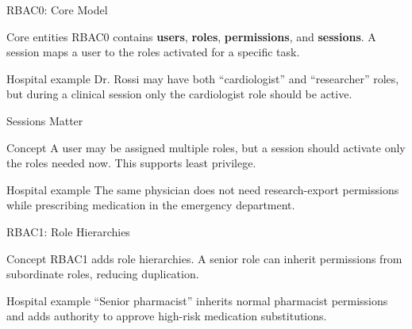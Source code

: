 \documentclass[presentation]{beamer}
\begin{document}
\begin{frame}[c]{RBAC0: Core Model}
\begin{block}{Core entities}
RBAC0 contains \textbf{users}, \textbf{roles}, \textbf{permissions}, and \textbf{sessions}. A
session maps a user to the roles activated for a specific task.
\end{block}

\begin{exampleblock}{Hospital example}
Dr. Rossi may have both ``cardiologist'' and ``researcher'' roles, but during a clinical session only
the cardiologist role should be active.
\end{exampleblock}
\end{frame}

\begin{frame}[c]{Sessions Matter}
\begin{block}{Concept}
A user may be assigned multiple roles, but a session should activate only the roles needed now.
This supports least privilege.
\end{block}

\begin{exampleblock}{Hospital example}
The same physician does not need research-export permissions while prescribing medication in the
emergency department.
\end{exampleblock}
\end{frame}

\begin{frame}[c]{RBAC1: Role Hierarchies}
\begin{block}{Concept}
RBAC1 adds role hierarchies. A senior role can inherit permissions from subordinate roles, reducing
duplication.
\end{block}

\begin{exampleblock}{Hospital example}
``Senior pharmacist'' inherits normal pharmacist permissions and adds authority to approve high-risk
medication substitutions.
\end{exampleblock}
\end{frame}
\end{document}
